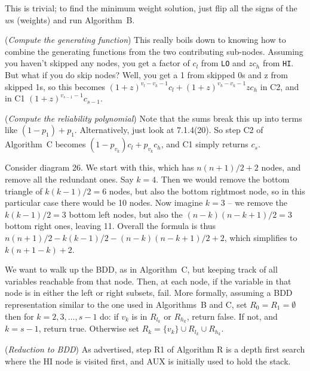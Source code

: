 \vskip 0.08in  This is trivial; to find the minimum
weight solution, just flip all the signs of the $w$s (weights) and run Algorithm~B.

\vskip 0.08in  ({\it Compute the generating function})
\hfil\break This really boils down to knowing how to combine the generating
functions from the two contributing sub-nodes.  Assuming you haven't
skipped any nodes, you get a factor of $c_l$ from {\tt LO} and $z c_h$
from {\tt HI}.  But what if you do skip nodes?  Well, you get a 1 from skipped
0s and z from skipped 1s, so this becomes $\left(1 + z\right)^{v_l - v_k - 1} c_l
+ \left(1 + z\right)^{v_h - v_k - 1} z c_h$ in C2, and in C1 $\left(1 + z\right)^{v_{s-1} - 1}
c_{s-1}$. 

\vskip 0.08in  ({\it Compute the reliability polynomial})
\hfil\break Note that the sums break this up into terms like
$\left(1 - p_1\right) + p_1$.  Alternatively, just look at 7.1.4(20).
So step C2 of Algorithm~C becomes
$\left(1 - p_{v_k}\right) c_l + p_{v_k} c_h$, and C1 simply returns $c_s$.

\vskip 0.08in  Consider diagram 26.
We start with this, which has $n \left(n + 1\right) / 2 + 2$ nodes,
and remove all the redundant ones.  Say $k = 4$.  Then we
would remove the bottom triangle of $k \left(k - 1\right) / 2 = 6$ nodes,
but also the bottom rightmost node, so in this particular case
there would be 10 nodes.  Now imagine $k = 3$ -- we remove
the $k \left(k - 1\right) / 2 = 3$ bottom left nodes, but also 
the $\left(n - k\right) \left(n - k + 1\right) / 2 = 3$ bottom right ones,
leaving 11.  Overall the formula is thus $n \left(n + 1\right) / 2
- k \left(k - 1\right) / 2 - \left(n - k\right) \left(n - k + 1\right) / 2 + 2$,
which simplifies to $k \left(n + 1 - k\right) + 2$.

\vskip 0.08in  We want to walk up the BDD,
as in Algorithm~C, but keeping track of all variables reachable from
that node.  Then, at each node, if the variable in that node is in either
the left or right subsets, fail.  More formally, assuming a BDD representation similar
to the one used in Algorithms~B and C, set $R_0 = R_1 = \emptyset$
then for $k = 2, 3, \ldots, s - 1$ do: if $v_k$ is in $R_{l_k}$ or $R_{h_k}$,
return false.  If not, and $k=s-1$, return true. 
Otherwise set $R_k = \{v_k\} \cup R_{l_k} \cup R_{h_k}$.

\vskip 0.08in  ({\it Reduction to BDD})\hfil \break
As advertised, step R1 of Algorithm R is a depth first search where
the HI node is visited first, and AUX is initially used to hold the stack.

